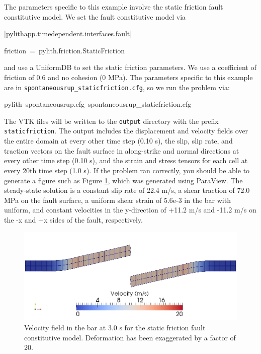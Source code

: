 The parameters specific to this example involve the static friction
fault constitutive model. We set the fault constitutive model via
\begin{lyxcode}
{[}pylithapp.timedependent.interfaces.fault{]}

friction~=~pylith.friction.StaticFriction
\end{lyxcode}
and use a UniformDB to set the static friction parameters. We use
a coefficient of friction of 0.6 and no cohesion (0 MPa). The parameters
specific to this example are in \texttt{spontaneousrup\_staticfriction.cfg},
so we run the problem via:
\begin{lyxcode}
pylith~spontaneousrup.cfg~spontaneousrup\_staticfriction.cfg
\end{lyxcode}
The VTK files will be written to the \texttt{output} directory with
the prefix \texttt{staticfriction}. The output includes the displacement
and velocity fields over the entire domain at every other time step
(0.10 s), the slip, slip rate, and traction vectors on the fault surface
in along-strike and normal directions at every other time step (0.10
s), and the strain and stress tensors for each cell at every 20th
time step (1.0 s). If the problem ran correctly, you should be able
to generate a figure such as Figure \ref{fig:shearwave:quad4:staticfriction},
which was generated using ParaView. The steady-state solution is a
constant slip rate of 22.4 m/s, a shear traction of 72.0 MPa on the
fault surface, a uniform shear strain of 5.6e-3 in the bar with uniform,
and constant velocities in the y-direction of +11.2 m/s and -11.2
m/s on the -x and +x sides of the fault, respectively.

\noindent \begin{center}
\begin{figure}
\begin{centering}
\includegraphics[scale=0.5]{tutorials/shearwave/figs/quad4staticfriction30}
\par\end{centering}

\caption{Velocity field in the bar at 3.0 s for the static friction fault constitutive
model. Deformation has been exaggerated by a factor of 20.\label{fig:shearwave:quad4:staticfriction}}
\end{figure}

\par\end{center}


